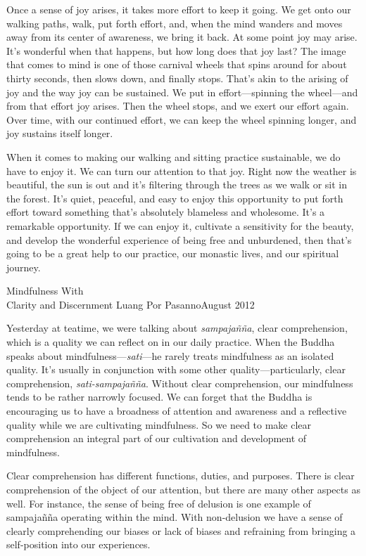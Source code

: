 Once a sense of joy arises, it takes more effort to keep it going. We 
get onto our walking paths, walk, put forth effort, and, when the mind 
wanders and moves away from its center of awareness, we bring it back. 
At some point joy may arise. It's wonderful when that happens, but how 
long does that joy last? The image that comes to mind is one of those 
carnival wheels that spins around for about thirty seconds, then slows 
down, and finally stops. That's akin to the arising of joy and the way 
joy can be sustained. We put in effort---spinning the wheel---and from 
that effort joy arises. Then the wheel stops, and we exert our effort 
again. Over time, with our continued effort, we can keep the wheel 
spinning longer, and joy sustains itself longer.

When it comes to making our walking and sitting practice sustainable, 
we do have to enjoy it. We can turn our attention to that joy. Right 
now the weather is beautiful, the sun is out and it's filtering through 
the trees as we walk or sit in the forest. It's quiet, peaceful, and 
easy to enjoy this opportunity to put forth effort toward something 
that's absolutely blameless and wholesome. It's a remarkable 
opportunity. If we can enjoy it, cultivate a sensitivity for the 
beauty, and develop the wonderful experience of being free and 
unburdened, then that's going to be a great help to our practice, our 
monastic lives, and our spiritual journey.

{Mindfulness With\\Clarity and Discernment}
{Luang Por Pasanno}{August 2012}

Yesterday at teatime, we were talking about \emph{sampajañña}, clear 
comprehension, which is a quality we can reflect on in our daily 
practice. When the Buddha speaks about mindfulness---\emph{sati}---he 
rarely treats mindfulness as an isolated quality. It's usually in 
conjunction with some other quality---particularly, clear 
comprehension, \emph{sati-sampajañña}. Without clear comprehension, 
our mindfulness tends to be rather narrowly focused. We can forget that 
the Buddha is encouraging us to have a broadness of attention and 
awareness and a reflective quality while we are cultivating 
mindfulness. So we need to make clear comprehension an integral part of 
our cultivation and development of mindfulness.

Clear comprehension has different functions, duties, and purposes. 
There is clear comprehension of the object of our attention, but there 
are many other aspects as well. For instance, the sense of being free 
of delusion is one example of sampajañña operating within the mind. 
With non-delusion we have a sense of clearly comprehending our biases 
or lack of biases and refraining from bringing a self-position into our 
experiences.

